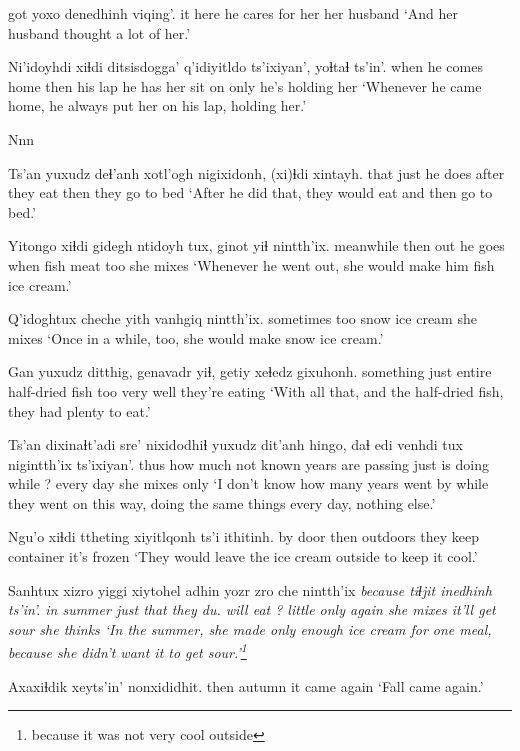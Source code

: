 \documentclass[12pt]{article}
\begin{document}
 got {yoxo denedhinh} viqing'. 
it here {he cares for her} {her husband} 
\glt `And her husband thought a lot of her.'
\glend

\gll Ni'idoyhdi xiɬdi ditsisdogga' q'idiyitldo ts'ixiyan', yoɬtaɬ ts'in'.
{when he comes home} then {his lap} {he has her sit on} only {he's holding her} {}
\glt `Whenever he came home, he always put her on his lap, holding her.'
\glend

Nnn 

\gll Ts'an yuxudz deɬ'anh xotl'ogh {nigixidonh}, (xi)ɬdi xintayh.
that just {he does} after {they eat} then {they go to bed}
\glt `After he did that, they would eat and then go to bed.'
\glend

\gll Yitongo xiɬdi gidegh ntidoyh tux, ginot yiɬ nintth'ix.
meanwhile then out {he goes} when {fish meat} too {she mixes}
\glt `Whenever he went out, she would make him fish ice cream.'
\glend

\gll Q'idoghtux cheche yith vanhgiq nintth'ix.
{sometimes} too snow {ice cream} {she mixes}
\glt `Once in a while, too, she would make snow ice cream.'
\glend

\gll Gan yuxudz ditthig, genavadr yiɬ, getiy xeɬedz gixuhonh.
something just entire {half-dried fish} too very well {they're eating}
\glt `With all that, and the half-dried fish, they had plenty to eat.'
\glend

\gll Ts'an dixinaɬt'adi sre' nixidodhiɬ yuxudz dit'anh hingo, daɬ {edi venhdi tux} nigintth'ix ts'ixiyan'.
thus {how much} {not known} {years are passing} just {is doing} while ? {every day} {she mixes} only
\glt `I don't know how many years went by while they went on this way, doing the same things every day, nothing else.'
\glend

\gll Ngu'o xiɬdi ttheting xiyitlqonh ts'i ithitinh.
{by door} then outdoors {they keep container} {} {it's frozen}
\glt `They would leave the ice cream outside to keep it cool.'
\glend

\gll Sanhtux xizro yiggi xiytohel adhin yozr zro che nintth'ix \em{because} tiɬjit inedhinh ts'in'.
{in summer} just that {they du. will eat} ? little only again {she mixes} {}  {it'll get sour} {she thinks} {}
\glt `In the summer, she made only enough ice cream for one meal, because she didn't want it to get sour.'\footnote{because it was not very cool outside}
\glend

\gll Axaxiɬdik xeyts'in' nonxididhit.
then autumn {it came again}
\glt `Fall came again.'
\glend
\end{document}
